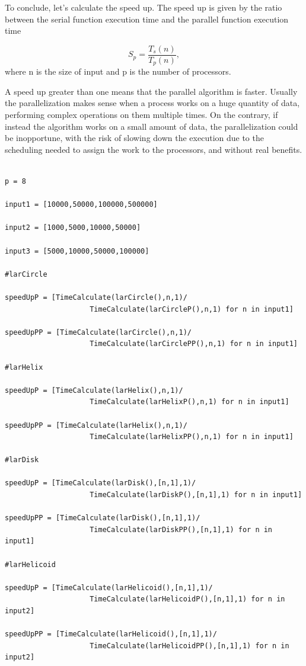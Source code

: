 \documentclass{article}
\begin{document}
To conclude, let's calculate the speed up. The speed up is given by the ratio between the serial function execution time and the parallel function execution time

$$S_p = \frac{T_s(n) }{T_p(n)}, $$ where n is the size of input and p is the number of processors.

A speed up greater than one means that the parallel algorithm is faster. Usually the parallelization makes sense when a process works on a huge quantity of data, performing complex operations on them multiple times. On the contrary, if instead the algorithm works on a small amount of data, the parallelization could be inopportune, with the risk of slowing down the execution due to the scheduling needed to assign the work to the processors, and without real benefits.

\begin{Verbatim}

p = 8

input1 = [10000,50000,100000,500000]

input2 = [1000,5000,10000,50000]

input3 = [5000,10000,50000,100000]

#larCircle 

speedUpP = [TimeCalculate(larCircle(),n,1)/
                    TimeCalculate(larCircleP(),n,1) for n in input1]

speedUpPP = [TimeCalculate(larCircle(),n,1)/
                    TimeCalculate(larCirclePP(),n,1) for n in input1]

#larHelix

speedUpP = [TimeCalculate(larHelix(),n,1)/
                    TimeCalculate(larHelixP(),n,1) for n in input1]

speedUpPP = [TimeCalculate(larHelix(),n,1)/
                    TimeCalculate(larHelixPP(),n,1) for n in input1]

#larDisk

speedUpP = [TimeCalculate(larDisk(),[n,1],1)/
                    TimeCalculate(larDiskP(),[n,1],1) for n in input1]

speedUpPP = [TimeCalculate(larDisk(),[n,1],1)/
                    TimeCalculate(larDiskPP(),[n,1],1) for n in input1]

#larHelicoid

speedUpP = [TimeCalculate(larHelicoid(),[n,1],1)/
                    TimeCalculate(larHelicoidP(),[n,1],1) for n in input2]

speedUpPP = [TimeCalculate(larHelicoid(),[n,1],1)/
                    TimeCalculate(larHelicoidPP(),[n,1],1) for n in input2]


\end{Verbatim}
\end{document}
